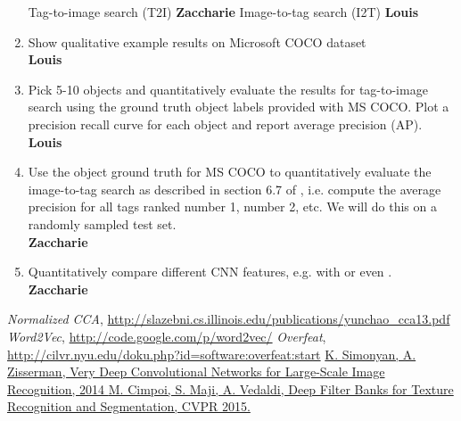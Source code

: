 \documentclass[a4paper,12pt]{article}
\begin{document}
\begin{enumerate}
    \subitem Tag-to-image search (T2I)
    \textbf{Zaccharie}
    \subitem Image-to-tag search (I2T)
    \textbf{Louis}
  \item Show qualitative example results on Microsoft COCO dataset
  \\\textbf{Louis}
  \item Pick 5-10 objects and quantitatively evaluate the results for tag-to-image search using the ground truth object labels provided with MS COCO. Plot a precision recall curve for each object and report average precision (AP).
  \\\textbf{Louis}
  \item Use the object ground truth for MS COCO to quantitatively evaluate the image-to-tag search as described in section 6.7 of \cite{normalizedcca}, i.e. compute the average precision for all tags ranked number 1, number 2, etc. We will do this on a randomly sampled test set.
  \\\textbf{Zaccharie}
  \item Quantitatively compare different CNN features, e.g. \cite{overfeat} with \cite{vgg} or even \cite{deepfilters}.
  \\\textbf{Zaccharie}

\end{enumerate}


\begin{thebibliography}{7}

  \emph{Normalized CCA},
  \url{http://slazebni.cs.illinois.edu/publications/yunchao\_cca13.pdf}
  \emph{Word2Vec},
  \url{http://code.google.com/p/word2vec/}
  \emph{Overfeat},
  \url{http://cilvr.nyu.edu/doku.php?id=software:overfeat:start}
  \href{http://arxiv.org/pdf/1409.1556.pdf}{
  K. Simonyan, A. Zisserman, Very Deep Convolutional Networks for Large-Scale Image Recognition, 2014
  }
  \href{http://www.robots.ox.ac.uk/~vgg/publications/2015/Cimpoi15/cimpoi15.pdf}{
  M. Cimpoi, S. Maji, A. Vedaldi, Deep Filter Banks for Texture Recognition and Segmentation, CVPR 2015.
  }
\end{thebibliography}
\end{document}
